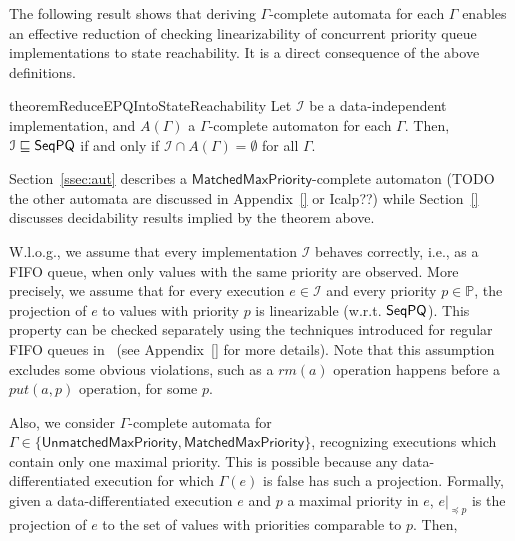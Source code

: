 The following result shows that deriving $\Gamma$-complete automata for each $\Gamma$ enables an effective reduction of checking linearizability of concurrent priority queue implementations to state reachability. It is a direct consequence of the above definitions.

\begin{restatable}{theorem}{ReduceEPQIntoStateReachability}
\label{lemma:reduce EPQ into state reachability}
Let $\mathcal{I}$ be a data-independent implementation, and $A(\Gamma)$ a $\Gamma$-complete automaton for each $\Gamma$. Then,
$\mathcal{I} \sqsubseteq \mathsf{SeqPQ}$ if and only if $\mathcal{I} \cap A(\Gamma) = \emptyset$ for all $\Gamma$.
\end{restatable}

Section~\ref{ssec:aut} describes a $\mathsf{MatchedMaxPriority}$-complete automaton (TODO the other automata are discussed in Appendix~\ref{} or Icalp??) while Section~\ref{} discusses decidability results implied by the theorem above.

W.l.o.g., we assume that every implementation $\mathcal{I}$ behaves correctly, i.e., as a FIFO queue, when only values with the same priority are observed. More precisely, we assume that for every execution $e\in\mathcal{I}$ and every priority $p\in\mathbb{P}$, the projection of $e$ to values with priority $p$ is linearizable (w.r.t. $\mathsf{SeqPQ}$). This property can be checked separately using the techniques introduced for regular FIFO queues in~\cite{DBLP:conf/icalp/BouajjaniEEH15} (see Appendix~\ref{} for more details). Note that this assumption excludes some obvious violations, such as a $\textit{rm}(a)$ operation happens before a $\textit{put}(a,p)$ operation, for some $p$.

Also, we consider $\Gamma$-complete automata for $\Gamma\in \{\mathsf{UnmatchedMaxPriority}, \mathsf{MatchedMaxPriority}\}$, recognizing executions which contain only one maximal priority. This is possible because any data-differentiated execution for which $\Gamma(e)$ is false has such a projection.
Formally, given a data-differentiated execution $e$ and $p$ a maximal priority in $e$, $e\vert_{\preceq p}$ is the projection of $e$ to the set of values with priorities comparable to $p$. Then,

